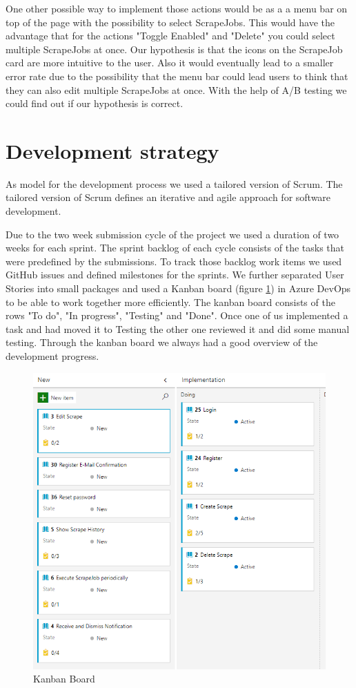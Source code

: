 \documentclass[titlepage, 12pt]{article}
\begin{document}
One other possible way to implement those actions would be as a a menu bar on top of the page with the possibility to select ScrapeJobs. This would have the advantage that for the actions "Toggle Enabled" and "Delete" you could select multiple ScrapeJobs at once.
Our hypothesis is that the icons on the ScrapeJob card are more intuitive to the user. Also it would eventually lead to a smaller error rate due to the possibility that the menu bar could lead users to think that they can also edit multiple ScrapeJobs at once.
With the help of A/B testing we could find out if our hypothesis is correct.

\pagebreak

\section{Development strategy}

As model for the development process we used a tailored version of Scrum. The tailored version of Scrum defines an iterative and agile approach for software development.

Due to the two week submission cycle of the project we used a duration of two weeks for each sprint. The sprint backlog of each cycle consists of the tasks that were predefined by the submissions. To track those backlog work items we used GitHub issues and defined milestones for the sprints. We further separated User Stories into small packages and used a Kanban board (figure \ref{fig:kanbanBoard}) in Azure DevOps to be able to work together more efficiently. The kanban board consists of the rows "To do", "In progress", "Testing" and "Done". Once one of us implemented a task and had moved it to Testing the other one reviewed it and did some manual testing. Through the kanban board we always had a good overview of the development progress. 

\begin{figure}[H]
  \centering
  \includegraphics[width=0.65\linewidth]{KanbanBoard.png}
  \caption{Kanban Board}
  \label{fig:kanbanBoard}
\end{figure}
\end{document}
